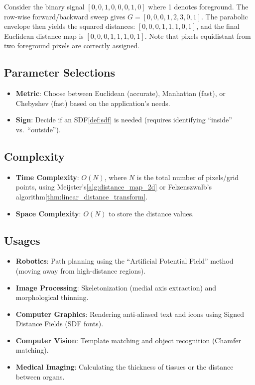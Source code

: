 \begin{example}\label{example:dt_1d}
Consider the binary signal $[0, 0, 1, 0, 0, 0, 1, 0]$ where 1 denotes foreground. The row-wise forward/backward sweep gives $G = [0, 0, 0, 1, 2, 3, 0, 1]$. The parabolic envelope then yields the squared distances: $[0, 0, 0, 1, 1, 1, 0, 1]$, and the final Euclidean distance map is $[0, 0, 0, 1, 1, 1, 0, 1]$. Note that pixels equidistant from two foreground pixels are correctly assigned.
\end{example}

\subsection{Parameter Selections}
\begin{itemize}
  \item \textbf{Metric}: Choose between Euclidean (accurate), Manhattan (fast), or Chebyshev (fast) based on the application's needs.
  \item \textbf{Sign}: Decide if an SDF\cref{def:sdf} is needed (requires identifying ``inside'' vs.\ ``outside'').
\end{itemize}

\subsection{Complexity}
\begin{itemize}
  \item \textbf{Time Complexity}: $O(N)$, where $N$ is the total number of pixels/grid points, using Meijster's\cref{alg:distance_map_2d} or Felzenszwalb's algorithm\cref{thm:linear_distance_transform}.
  \item \textbf{Space Complexity}: $O(N)$ to store the distance values.
\end{itemize}

\subsection{Usages}
\begin{itemize}
  \item \textbf{Robotics}: Path planning using the ``Artificial Potential Field'' method (moving away from high-distance regions).
  \item \textbf{Image Processing}: Skeletonization (medial axis extraction) and morphological thinning.
  \item \textbf{Computer Graphics}: Rendering anti-aliased text and icons using Signed Distance Fields (SDF fonts).
  \item \textbf{Computer Vision}: Template matching and object recognition (Chamfer matching).
  \item \textbf{Medical Imaging}: Calculating the thickness of tissues or the distance between organs.
\end{itemize}

